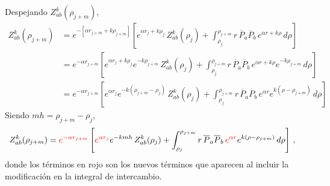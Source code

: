 \documentclass[11pt]{article}
\begin{document}
Despejando $Z_{ab}^k(\rho_{j+m})$,
\begin{align} 
 Z_{ab}^k(\rho_{j+m}) 
 &= e^{-\left[\alpha r_{j+m}+k\rho_{j+m}\right]} \left[e^{\alpha r_j+k\rho_j}\,Z_{ab}^k(\rho_j) + \int_{\rho_j}^{\rho_{j+m}} r\,\overline{P}_a\overline{P}_b\, e^{\alpha r+k\rho}\,d\rho \right] \\ 
 &= e^{-\alpha r_{j+m}}\left[e^{\alpha r_j+k\rho_j}e^{-k\rho_{j+m}} \,Z_{ab}^k(\rho_j) + \int_{\rho_j}^{\rho_{j+m}} r\,\overline{P}_a\overline{P}_b\, e^{\alpha r+k\rho}e^{-k\rho_{j+m}} \,d\rho \right] \\ 
 &= e^{-\alpha r_{j+m}}\left[e^{\alpha r_j}e^{-k(\rho_{j+m}-\rho_j)} \,Z_{ab}^k(\rho_j) + \int_{\rho_j}^{\rho_{j+m}} r\,\overline{P}_a\overline{P}_b\, e^{\alpha r}e^{k(\rho-\rho_{j+m})} \,d\rho \right] 
\end{align}
Siendo $mh=\rho_{j+m}-\rho_j$,
\begin{align}
 Z_{ab}^k(\rho_{j+m}) 
 &= {\color{red} e^{-\alpha r_{j+m}} }\left[ {\color{red} e^{\alpha r_j} } e^{-kmh}\,Z_{ab}^k(\rho_j) + \int_{\rho_j}^{\rho_{j+m}} r\,\overline{P}_a\overline{P}_b\,{\color{red} e^{\alpha r}}e^{k(\rho-\rho_{j+m})}\,d\rho \right] \,,
\end{align}
donde los términos en rojo son los nuevos términos que aparecen 
al incluir la modificación en la integral de intercambio.
\end{document}
